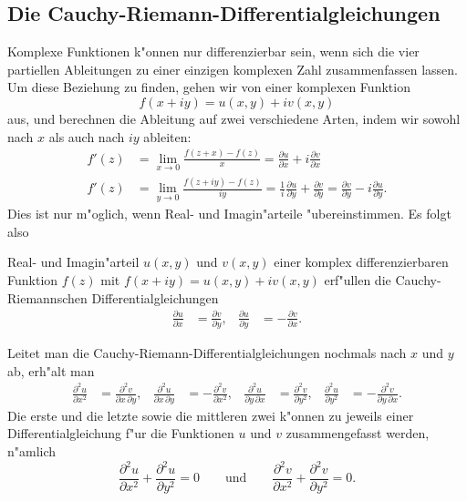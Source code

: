 %
%
\subsection{Die Cauchy-Riemann-Differentialgleichungen}
Komplexe Funktionen k"onnen nur differenzierbar sein, wenn sich die vier
partiellen Ableitungen zu einer einzigen komplexen Zahl zusammenfassen
lassen.
Um diese Beziehung zu finden, gehen wir von einer komplexen Funktion
\[
f(x+iy) = u(x,y) + iv(x,y)
\]
aus, und berechnen die Ableitung auf zwei verschiedene Arten, indem
wir sowohl nach $x$ als auch nach $iy$ ableiten:
\begin{align*}
f'(z)&
=
\lim_{x\to 0}\frac{f(z+x)-f(z)}{x}
=
\frac{\partial u}{\partial x}+i\frac{\partial v}{\partial x}
\\
f'(z)&
=
\lim_{y\to 0}\frac{f(z+iy)-f(z)}{iy}
=
\frac1{i}
\frac{\partial u}{\partial y}+\frac{\partial v}{\partial y}
=
\frac{\partial v}{\partial y}
-i
\frac{\partial u}{\partial y}.
\end{align*}
Dies ist nur m"oglich, wenn Real- und Imagin"arteile "ubereinstimmen.
Es folgt also

\begin{satz}
\label{komplex:satz:cauchy-riemann}
Real- und Imagin"arteil $u(x,y)$ und $v(x,y)$ einer
komplex differenzierbaren Funktion $f(z)$ mit $f(x+iy)=u(x,y)+iv(x,y)$
erf"ullen die Cauchy-Riemannschen Differentialgleichungen
\begin{equation}
\begin{aligned}
\frac{\partial u}{\partial x}
&=
\frac{\partial v}{\partial y},
&
\frac{\partial u}{\partial y}
&=
-
\frac{\partial v}{\partial x}.
\end{aligned}
\label{komplex:dgl:cauchy-riemann}
\end{equation}
\end{satz}

Leitet man die Cauchy-Riemann-Differentialgleichungen nochmals nach
$x$ und $y$ ab, erh"alt man
\begin{equation*}
\begin{aligned}
\frac{\partial^2 u}{\partial x^2}
&=
\frac{\partial^2 v}{\partial x\,\partial y},
&
\frac{\partial^2 u}{\partial x\,\partial y}
&=
-\frac{\partial^2 v}{\partial x^2},
&
\frac{\partial^2 u}{\partial y\,\partial x}
&=
\frac{\partial^2 v}{\partial y^2},
&
\frac{\partial^2 u}{\partial y^2}
&=
-\frac{\partial^2 v}{\partial y\,\partial x}.
\end{aligned}
\end{equation*}
Die erste und die letzte sowie die mittleren zwei k"onnen zu jeweils
einer Differentialgleichung f"ur die Funktionen $u$ und $v$ zusammengefasst
werden, n"amlich
\begin{equation*}
\frac{\partial^2 u}{\partial x^2}
+
\frac{\partial^2 u}{\partial y^2}
=
0
\qquad\text{und}\qquad
\frac{\partial^2 v}{\partial x^2}
+
\frac{\partial^2 v}{\partial y^2}
=
0.
\end{equation*}

